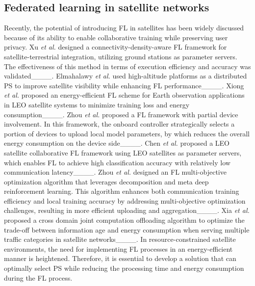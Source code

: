 \subsection{Federated learning in satellite networks}
Recently, the potential of introducing FL in satellites has been widely discussed because of its ability to enable collaborative training while preserving user privacy. Xu \textit{et al.} designed a connectivity-density-aware FL framework for satellite-terrestrial integration, utilizing ground stations as parameter servers. The effectiveness of this method in terms of execution efficiency and accuracy was validated____. Elmahalawy \textit{et al.} used high-altitude platforms as a distributed PS to improve satellite visibility while enhancing FL performance____. Xiong \textit{et al.} proposed an energy-efficient FL scheme for Earth observation applications in LEO satellite systems to minimize training loss and energy consumption____. Zhou \textit{et al.} proposed a FL framework with partial device involvement. In this framework, the onboard controller strategically selects a portion of devices to upload local model parameters, by which reduces the overall energy consumption on the device side____. Chen \textit{et al.} proposed a LEO satellite collaborative FL framework using LEO satellites as parameter servers, which enables FL to achieve high classification accuracy with relatively low communication latency____. Zhou \textit{et al.} designed an FL multi-objective optimization algorithm that leverages decomposition and meta deep reinforcement learning. This algorithm enhances both communication training efficiency and local training accuracy by addressing multi-objective optimization challenges, resulting in more efficient uploading and aggregation____. Xia \textit{et al.} proposed a cross domain joint computation offloading algorithm to optimize the trade-off between information age and energy consumption when serving multiple traffic categories in satellite networks____. In resource-constrained satellite environments, the need for implementing FL processes in an energy-efficient manner is heightened. Therefore, it is essential to develop a solution that can optimally select PS while reducing the processing time and energy consumption during the FL process. 

